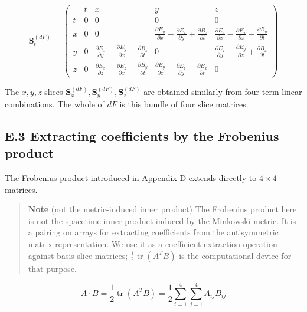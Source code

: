 \documentclass[a4paper,12pt,openany]{book}
\begin{document}
\[
\mathbf{S}_{t}^{(dF)}
{=}
\left(\begin{array}{c|cccc}
 & t & x & y & z \\\hline
t & 0 & 0 & 0 & 0 \\[6pt]
x & 0 & 0 &
\displaystyle \frac{\partial E_y}{\partial x} - \frac{\partial E_x}{\partial y} + \frac{\partial B_z}{\partial t} &
\displaystyle \frac{\partial E_z}{\partial x} - \frac{\partial E_x}{\partial z} - \frac{\partial B_y}{\partial t} \\[14pt]
y & 0 &
\displaystyle \frac{\partial E_x}{\partial y} - \frac{\partial E_y}{\partial x} - \frac{\partial B_z}{\partial t} &
0 &
\displaystyle \frac{\partial E_z}{\partial y} - \frac{\partial E_y}{\partial z} + \frac{\partial B_x}{\partial t} \\[14pt]
z & 0 &
\displaystyle \frac{\partial E_x}{\partial z} - \frac{\partial E_z}{\partial x} + \frac{\partial B_y}{\partial t} &
\displaystyle \frac{\partial E_y}{\partial z} - \frac{\partial E_z}{\partial y} - \frac{\partial B_x}{\partial t} &
0
\end{array}\right)
\]

The \(x,y,z\) slices
\(\mathbf{S}_{x}^{(dF)}, \mathbf{S}_{y}^{(dF)}, \mathbf{S}_{z}^{(dF)}\)
are obtained similarly from four-term linear combinations. The whole of
\(dF\) is this bundle of four slice matrices.

\hypertarget{e.3-extracting-coefficients-by-the-frobenius-product}{%
\subsection*{E.3 Extracting coefficients by the Frobenius
product}\label{e.3-extracting-coefficients-by-the-frobenius-product}}

The Frobenius product introduced in Appendix D extends directly to
\(4\times4\) matrices.

\begin{quote}
\textbf{Note} (not the metric-induced inner product) The Frobenius
product here is not the spacetime inner product induced by the Minkowski
metric. It is a pairing on arrays for extracting coefficients from the
antisymmetric matrix representation. We use it as a
coefficient-extraction operation against basis slice matrices;
\(\frac{1}{2}\operatorname{tr}(A^T B)\) is the computational device for
that purpose.
\end{quote}

\[
A \cdot B = \frac{1}{2}\operatorname{tr}(A^T B) = \frac{1}{2}\sum_{i=1}^{4}\sum_{j=1}^{4} A_{ij}B_{ij}
\]
\end{document}
